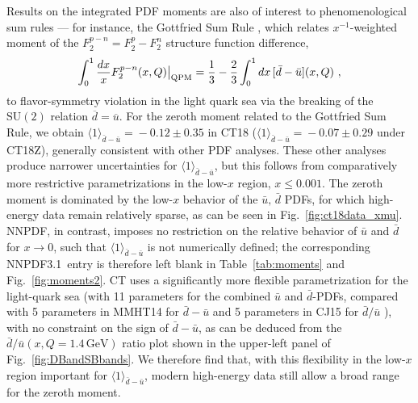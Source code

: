 Results on the integrated PDF moments are also of interest to phenomenological sum rules --- for instance, the Gottfried Sum
Rule \cite{Gottfried:1967kk}, which relates $x^{-1}$-weighted moment of the $F^{p-n}_2 = F^{p}_2\! -\! F^{n}_2$ structure function difference,
%
\begin{equation}
\int_0^1\frac{dx}{x}F^{p-n}_2(x,\Q)\big|_\mathrm{QPM} =\frac{1}{3} - \frac{2}{3}\int_{0}^{1} dx\, [\bar{d}-\bar{u}](x,\Q)\ ,
%
\label{eq:Gott}
\end{equation}
%
to flavor-symmetry violation in the light quark sea via the breaking of the $\mathrm{SU}(2)$ relation
$\overline{d} = \overline{u}$.
%
For the zeroth moment related to the Gottfried Sum Rule, we obtain $\langle 1 \rangle_{\bar{d}-\bar{u}}\! =\! -0.12\!\pm\!0.35$ in CT18
($\langle 1 \rangle_{\bar{d}-\bar{u}}\! =\! -0.07\!\pm\!0.29$ under CT18Z), generally consistent with other PDF analyses. These other
analyses produce narrower uncertainties for $\langle 1 \rangle_{\bar{d}-\bar{u}}$, but this follows from comparatively
more restrictive parametrizations in the low-$x$ region, $x\! \le\! 0.001$. The zeroth moment is dominated by the low-$x$ behavior
of the $\bar{u},\,\bar{d}$ PDFs, for which high-energy data remain relatively sparse, as can be seen in Fig.~\ref{fig:ct18data_xmu}.
NNPDF, in contrast, imposes no restriction on the relative behavior of $\bar{u}$ and $\bar{d}$ for $x \to 0$, such that
$\langle 1 \rangle_{\bar{d}-\bar{u}}$ is not numerically defined; the corresponding NNPDF3.1~entry is therefore left blank in Table~\ref{tab:moments}
and Fig.~\ref{fig:moments2}.
%
CT uses a significantly more flexible parametrization for the light-quark sea (with 11 parameters for the combined $\bar{u}$ and $\bar{d}$-PDFs,
compared with 5 parameters in MMHT14 for $\bar{d}-\bar{u}$ \cite{Harland-Lang:2014zoa} and 5 parameters in CJ15 for $\bar{d}/\bar{u}$ \cite{Accardi:2016qay}),
with no constraint on the sign of $\bar{d}\!-\!\bar{u}$, as can be deduced from the $\bar{d}/\bar{u}(x,Q\!=\! 1.4\,\mathrm{GeV})$ ratio plot shown in the upper-left
panel of Fig.~\ref{fig:DBandSBbands}. We therefore find that, with this flexibility in the low-$x$ region important for
$\langle 1 \rangle_{\bar{d}-\bar{u}}$, modern high-energy data still allow a broad range for the zeroth moment.


